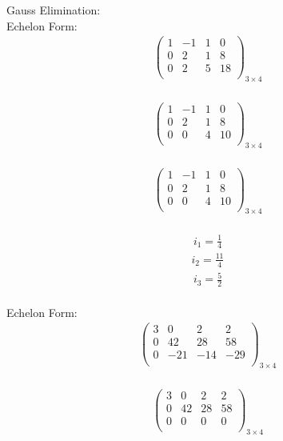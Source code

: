 \documentclass{article}
\begin{document}
Gauss Elimination:\\
Echelon Form:\\
\begin{align*}
\left(
\begin{array}{ccc|c}
1 & -1 & 1 & 0\\
0 & 2 & 1 & 8\\
0 & 2 & 5 & 18\\
\end{array}
\right)_{3\times 4}
\end{align*}
\\
\begin{align*}
\left(
\begin{array}{ccc|c}
1 & -1 & 1 & 0\\
0 & 2 & 1 & 8\\
0 & 0 & 4 & 10\\
\end{array}
\right)_{3\times 4}
\end{align*}
\\
\begin{align*}
\left(
\begin{array}{ccc|c}
1 & -1 & 1 & 0\\
0 & 2 & 1 & 8\\
0 & 0 & 4 & 10\\
\end{array}
\right)_{3\times 4}
\end{align*}
\\
\begin{align*}
i_{1} = \frac{1}{4}\end{align*}
\begin{align*}
i_{2} = \frac{11}{4}\end{align*}
\begin{align*}
i_{3} = \frac{5}{2}\end{align*}
\\
Echelon Form:\\
\begin{align*}
\begin{pmatrix}
3 & 0 & 2 & 2\\
0 & 42 & 28 & 58\\
0 & -21 & -14 & -29\\
\end{pmatrix}_{3\times 4}
\end{align*}
\\
\begin{align*}
\begin{pmatrix}
3 & 0 & 2 & 2\\
0 & 42 & 28 & 58\\
0 & 0 & 0 & 0\\
\end{pmatrix}_{3\times 4}
\end{align*}
\end{document}
